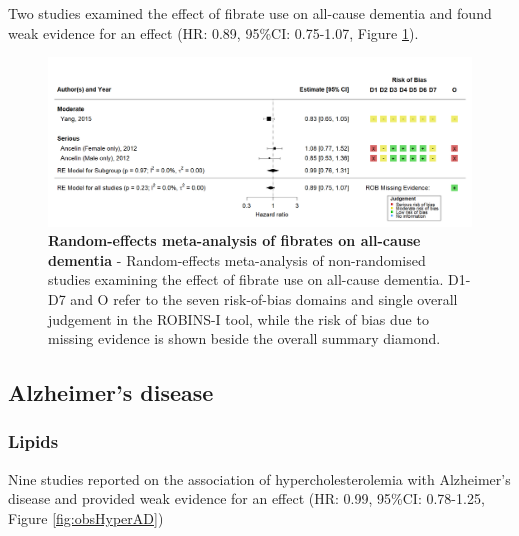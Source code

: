 \documentclass[a4paper, twoside]{templates/ociamthesis}
\begin{document}
Two studies examined the effect of fibrate use on all-cause dementia and found weak evidence for an effect (HR: 0.89, 95\%CI: 0.75-1.07, Figure \ref{fig:obsFibrateDementiaFig}).





\begin{figure}[H]
\includegraphics[width=1\linewidth]{figures/sys-rev/fp_obs_Fibrate_Dementia} \caption[Random-effects meta-analysis of fibrates on all-cause dementia]{\textbf{Random-effects meta-analysis of fibrates on all-cause dementia} - Random-effects meta-analysis of non-randomised studies examining the effect of fibrate use on all-cause dementia. D1-D7 and O refer to the seven risk-of-bias domains and single overall judgement in the ROBINS-I tool, while the risk of bias due to missing evidence is shown beside the overall summary diamond.}\label{fig:obsFibrateDementiaFig}
\end{figure}

\hypertarget{sys-rev-res-AD}{%
\subsection{Alzheimer's disease}\label{sys-rev-res-AD}}

\hypertarget{lipids-1}{%
\subsubsection{Lipids}\label{lipids-1}}

Nine studies reported on the association of hypercholesterolemia with Alzheimer's disease and provided weak evidence for an effect (HR: 0.99, 95\%CI: 0.78-1.25, Figure \ref{fig:obsHyperAD})
\end{document}
